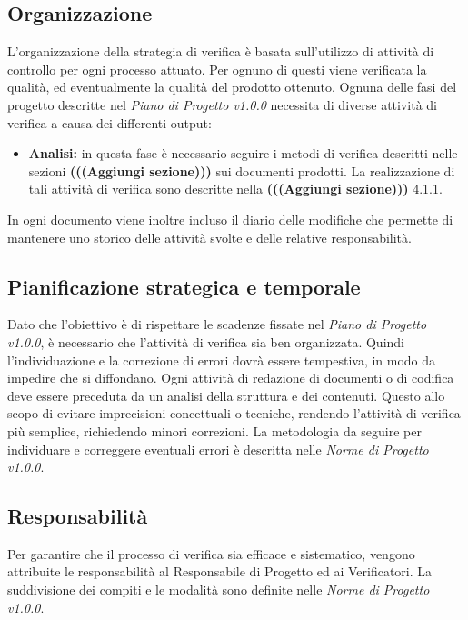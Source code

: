 \subsection{Organizzazione}
L'organizzazione della strategia di verifica è basata sull'utilizzo di attività 
di controllo per ogni processo attuato. Per ognuno di questi viene verificata 
la qualità, ed eventualmente la qualità del prodotto ottenuto.
Ognuna delle fasi del progetto descritte nel \textit{Piano di Progetto v1.0.0} necessita di diverse attività di verifica a causa dei differenti output:
\begin{itemize}
	\item \textbf{Analisi:} in questa fase è necessario seguire i metodi di 
	verifica descritti nelle sezioni \textbf{(((Aggiungi sezione)))} sui 
	documenti prodotti. La realizzazione di tali attività di verifica sono 
	descritte nella \textbf{(((Aggiungi sezione)))} 4.1.1.
\end{itemize}
In ogni documento viene inoltre incluso il diario delle modifiche che permette di mantenere uno storico delle attività svolte e delle relative responsabilità.

\subsection{Pianificazione strategica e temporale}
Dato che l'obiettivo è di rispettare le scadenze fissate nel \textit{Piano di 
Progetto v1.0.0}, è necessario che l'attività di verifica sia ben organizzata. 
Quindi l'individuazione e la correzione di errori dovrà essere tempestiva, in 
modo da impedire che si diffondano.\newline
Ogni attività di redazione di documenti o di codifica deve essere preceduta da un analisi della struttura e dei contenuti. Questo allo scopo di evitare imprecisioni concettuali o tecniche, rendendo l'attività di verifica più semplice, richiedendo minori correzioni.
La metodologia da seguire per individuare e correggere eventuali errori è descritta nelle \textit{Norme di Progetto v1.0.0}.

\subsection{Responsabilità}
Per garantire che il processo di verifica sia efficace e sistematico, vengono 
attribuite le responsabilità al Responsabile di Progetto ed ai Verificatori. La 
suddivisione dei compiti e le modalità sono definite nelle \textit{Norme di 
Progetto v1.0.0}.

